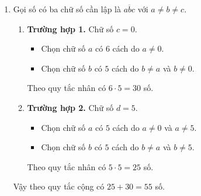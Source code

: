 \begin{vd}
{\begin{enumerate}
\begin{enumerate}
				\begin{itemize}
					\item Chọn chữ số $a$ có $5$ cách do $a\ne 0$ và $a \ne c$.
					\item Chọn chữ số $b$ có $5$ cách do $b\ne a$ và $b\ne c$.
				\end{itemize}
				Theo quy tắc nhân có $4\cdot 5\cdot 5=100$ số.
			\end{enumerate}
			Vậy theo quy tắc cộng có $30+100=130$ số.	
			\item Gọi số có ba chữ số cần lập là $\overline{abc}$ với $a\ne b\ne c$.
			\begin{enumerate}
				\item \textbf{Trường hợp 1.} Chữ số $c=0$.
				\begin{itemize}
					\item Chọn chữ số $a$ có $6$ cách do $a\ne 0$.
					\item Chọn chữ số $b$ có $5$ cách do $b\ne a$ và $b\ne 0$.
				\end{itemize}
				Theo quy tắc nhân có $6\cdot 5=30$ số.
				\item \textbf{Trường hợp 2.} Chữ số $d=5$.
				\begin{itemize}
					\item Chọn chữ số $a$ có $5$ cách do $a\ne 0$ và $a \ne 5$.
					\item Chọn chữ số $b$ có $5$ cách do $b\ne a$ và $b\ne 5$.
				\end{itemize}
				Theo quy tắc nhân có $5\cdot 5=25$ số.
			\end{enumerate}
			Vậy theo quy tắc cộng có $25+30=55$ số.	
		\end{enumerate}
	}
\end{vd}

